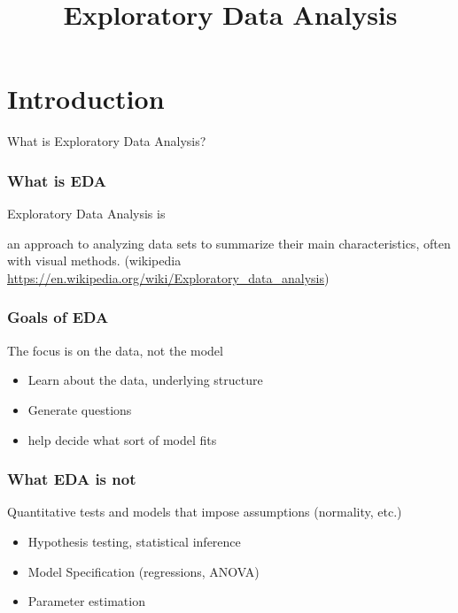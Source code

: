 \documentclass{beamer}
\begin{document}


\title{Exploratory Data Analysis}

\begin{frame}
\maketitle
\end{frame}


\begin{frame}
\tableofcontents
\end{frame}


\section{Introduction}

\begin{frame}
What is Exploratory Data Analysis?
\end{frame}


\begin{frame}
\frametitle{What is EDA}
Exploratory Data Analysis is 

an approach to analyzing data sets to summarize their main characteristics, often with visual methods. (wikipedia \url{https://en.wikipedia.org/wiki/Exploratory_data_analysis})    

\end{frame}


\begin{frame}
\frametitle{Goals of EDA}

The focus is on the data, not the model

\begin{itemize}
\item Learn about the data, underlying structure
\item Generate questions 
\item help decide what sort of model fits
\end{itemize}

\end{frame}



\begin{frame}
\frametitle{What EDA is not}

Quantitative tests and models that impose assumptions (normality, etc.)
\begin{itemize}
\item Hypothesis testing, statistical inference
\item Model Specification (regressions, ANOVA)
\item Parameter estimation
\end{itemize}

\end{frame}
\end{document}
